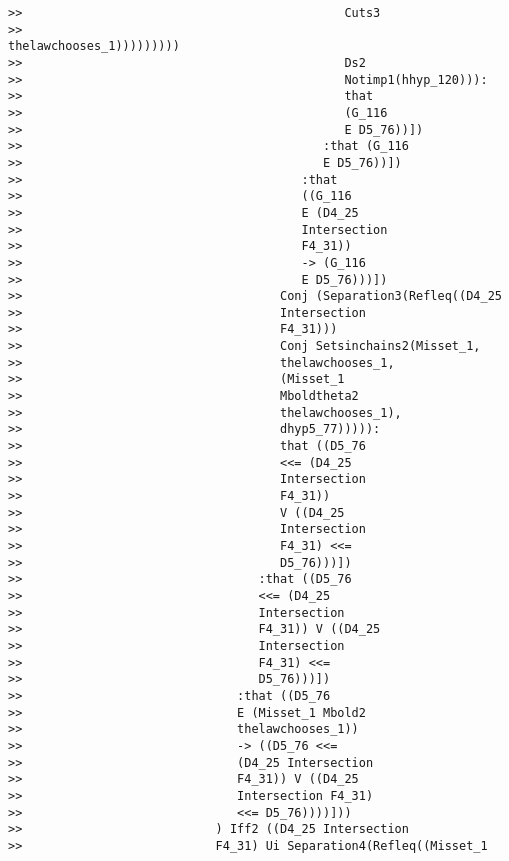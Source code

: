 \documentclass[12pt]{article}
\begin{document}
\begin{verbatim}
>>                                             Cuts3
>>                                             thelawchooses_1)))))))))
>>                                             Ds2
>>                                             Notimp1(hhyp_120))):
>>                                             that
>>                                             (G_116
>>                                             E D5_76))])
>>                                          :that (G_116
>>                                          E D5_76))])
>>                                       :that
>>                                       ((G_116
>>                                       E (D4_25
>>                                       Intersection
>>                                       F4_31))
>>                                       -> (G_116
>>                                       E D5_76)))])
>>                                    Conj (Separation3(Refleq((D4_25
>>                                    Intersection
>>                                    F4_31)))
>>                                    Conj Setsinchains2(Misset_1,
>>                                    thelawchooses_1,
>>                                    (Misset_1
>>                                    Mboldtheta2
>>                                    thelawchooses_1),
>>                                    dhyp5_77))))):
>>                                    that ((D5_76
>>                                    <<= (D4_25
>>                                    Intersection
>>                                    F4_31))
>>                                    V ((D4_25
>>                                    Intersection
>>                                    F4_31) <<=
>>                                    D5_76)))])
>>                                 :that ((D5_76
>>                                 <<= (D4_25
>>                                 Intersection
>>                                 F4_31)) V ((D4_25
>>                                 Intersection
>>                                 F4_31) <<=
>>                                 D5_76)))])
>>                              :that ((D5_76
>>                              E (Misset_1 Mbold2
>>                              thelawchooses_1))
>>                              -> ((D5_76 <<=
>>                              (D4_25 Intersection
>>                              F4_31)) V ((D4_25
>>                              Intersection F4_31)
>>                              <<= D5_76))))]))
>>                           ) Iff2 ((D4_25 Intersection
>>                           F4_31) Ui Separation4(Refleq((Misset_1

\end{verbatim}
\end{document}
